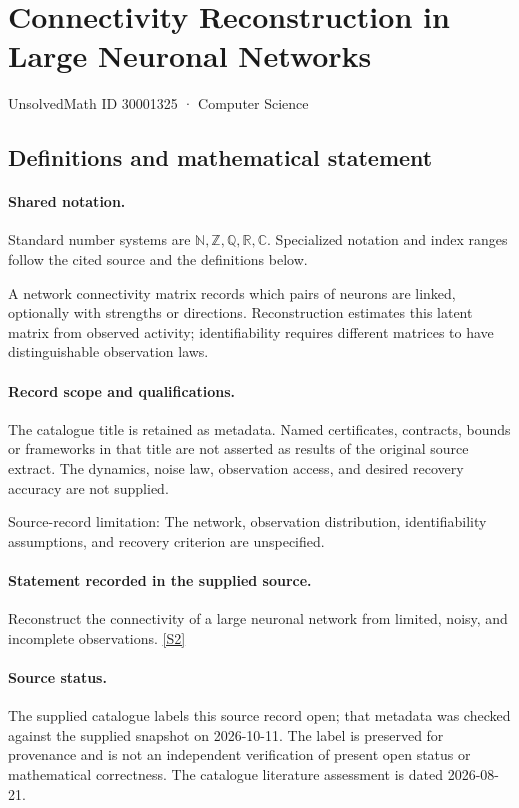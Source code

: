\documentclass[11pt]{article}
\newcommand{\sref}[2]{\hyperlink{source:#1:#2}{[S#2]}}
\begin{document}
\setcounter{section}{30001324}
\section{Connectivity Reconstruction in Large Neuronal Networks}\label{30001325}
{\small\sffamily UnsolvedMath ID 30001325 · Computer Science}
\subsection{Definitions and mathematical statement}

\paragraph{Shared notation.}Standard number systems are $\mathbb N,\mathbb Z,\mathbb Q,\mathbb R,\mathbb C$. Specialized notation and index ranges follow the cited source and the definitions below.


A network connectivity matrix records which pairs of neurons are linked, optionally with strengths or directions. Reconstruction estimates this latent matrix from observed activity; identifiability requires different matrices to have distinguishable observation laws.
\paragraph{Record scope and qualifications.}
The catalogue title is retained as metadata. Named certificates, contracts, bounds or frameworks in that title are not asserted as results of the original source extract.
The dynamics, noise law, observation access, and desired recovery accuracy are not supplied.

Source-record limitation: The network, observation distribution, identifiability assumptions, and recovery criterion are unspecified.
\paragraph{Statement recorded in the supplied source.}
Reconstruct the connectivity of a large neuronal network from limited, noisy, and incomplete observations. \sref{30001325}{2}
\paragraph{Source status.}
The supplied catalogue labels this source record open; that metadata was checked against the supplied snapshot on 2026-10-11. The label is preserved for provenance and is not an independent verification of present open status or mathematical correctness. The catalogue literature assessment is dated 2026-08-21.
\end{document}

